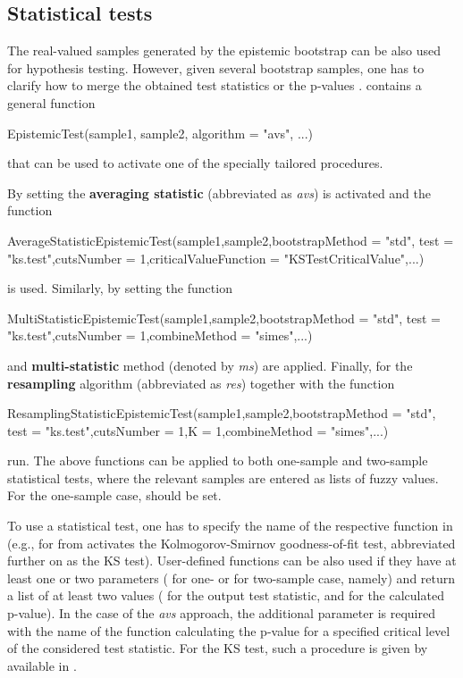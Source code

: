 \subsection{Statistical tests}


The real-valued samples generated by the epistemic bootstrap can be also used for hypothesis testing.
However, given several bootstrap samples, one has to clarify how to merge the obtained test statistics or the p-values \citep{10.1007/978-3-031-08974-9_39}.
 contains a general function
\begin{example}
EpistemicTest(sample1, sample2, algorithm = "avs", ...)
\end{example}
that can be used to activate one of the specially tailored procedures.

By setting  the \textbf{averaging statistic} (abbreviated as \emph{avs}) is activated and the function
\begin{example}
AverageStatisticEpistemicTest(sample1,sample2,bootstrapMethod = "std",
  test = "ks.test",cutsNumber = 1,criticalValueFunction = "KSTestCriticalValue",...)
\end{example}
is used.
Similarly, by setting  the function
\begin{example}
MultiStatisticEpistemicTest(sample1,sample2,bootstrapMethod = "std",
  test = "ks.test",cutsNumber = 1,combineMethod = "simes",...)
\end{example}
and \textbf{multi-statistic} method (denoted by \emph{ms}) are applied.
Finally, for  the \textbf{resampling} algorithm (abbreviated as \emph{res}) together with the function
\begin{example}
ResamplingStatisticEpistemicTest(sample1,sample2,bootstrapMethod = "std",
  test = "ks.test",cutsNumber = 1,K = 1,combineMethod = "simes",...)
\end{example}
run.
The above functions can be applied to both one-sample and two-sample statistical tests, where the relevant samples are entered as lists of fuzzy values.
For the one-sample case,  should be set.

To use a statistical test, one has to specify the name of the respective function in  (e.g.,  for  from  activates the Kolmogorov-Smirnov goodness-of-fit test, abbreviated further on as the KS test).
User-defined functions can be also used if they have at least one or two parameters ( for one- or  for two-sample case, namely) and return a list of at least two values ( for the output test statistic, and  for the calculated p-value).
In the case of the \emph{avs} approach, the additional parameter  is required with the name of the function  calculating the p-value for a specified critical level of the considered test statistic.
For the KS test, such a procedure is given by  available in .

